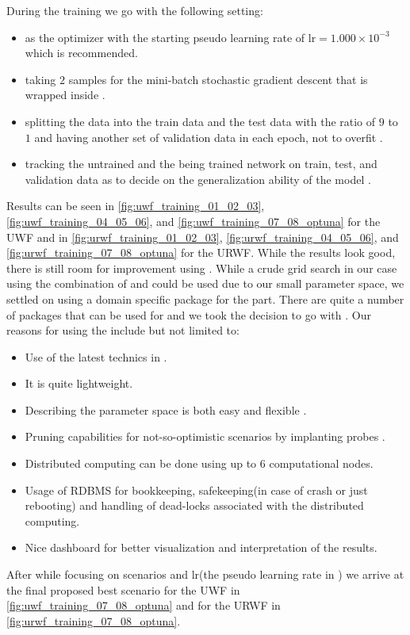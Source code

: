 During the training we go with the following setting:
\begin{itemize}
  \item \adam\cite{Kingma2014}\index{\adam} as the optimizer with the starting pseudo learning rate of $\mathrm{lr}=1.000\times10^{-3}$ which is recommended\cite{Kingma2014}\cite{Sun2019}.
  \item taking $2$ samples for the mini-batch stochastic gradient descent that is wrapped inside \adam\cite{Kingma2014}\index{\adam}.
  \item splitting the data into the train data and the test data with the ratio of $9$ to $1$ and having another set of 
  validation data in each epoch, not to overfit \cite{Chollet2023}.
  \item tracking the untrained and the being trained network on train, test, and validation data as to decide on the generalization ability of the model \cite{Chollet2023}.
\end{itemize}
Results can be seen in \cref{fig:uwf_training_01_02_03}, \ref{fig:uwf_training_04_05_06}, and \ref{fig:uwf_training_07_08_optuna} for the 
\ac{UWF} and in \cref{fig:urwf_training_01_02_03}, \ref{fig:urwf_training_04_05_06}, and \ref{fig:urwf_training_07_08_optuna} 
for the \ac{URWF}. While the results look good, there is still room for improvement using \ho\cite{Hutter2019}\cite{Akiba2019}\index{\ho}. 
While a crude grid search in our case using the combination of \bash\cite{Ramey2022}\index{\bash} and \awk\cite{Robbins2023}\index{\awk} could be used due to our small parameter space, we settled on 
using a domain specific package for the \ho\cite{Hutter2019}\cite{Akiba2019}\index{\ho} part. There are quite a number of packages that can be used for \ho\cite{Hutter2019}\cite{Akiba2019}\index{\ho} and we took the decision to go with 
\optuna\cite{Akiba2019}\index{\optuna}. Our reasons for using the \optuna\cite{Akiba2019}\index{\optuna} include but not limited to:
\begin{itemize}
  \item Use of the latest technics in \ho\cite{Hutter2019}\cite{Akiba2019}\index{\ho}.
  \item It is quite lightweight.
  \item Describing the parameter space is both easy and flexible \cite{Akiba2019}.
  \item Pruning capabilities for not-so-optimistic scenarios by implanting probes \cite{Akiba2019}.
  \item Distributed computing can be done using up to 6 computational nodes.
  \item Usage of \ac{RDBMS} for bookkeeping, safekeeping(in case of crash or just rebooting) and handling of dead-locks associated with the distributed computing.
  \item Nice dashboard for better visualization and interpretation of the results.  
\end{itemize}
After \ho\cite{Hutter2019}\cite{Akiba2019}\index{\ho} while focusing on scenarios and $\mathrm{lr}$(the pseudo learning rate in \adam) we arrive at the final proposed best scenario for the \ac{UWF} in 
\cref{fig:uwf_training_07_08_optuna} and for the \ac{URWF} in \cref{fig:urwf_training_07_08_optuna}.

